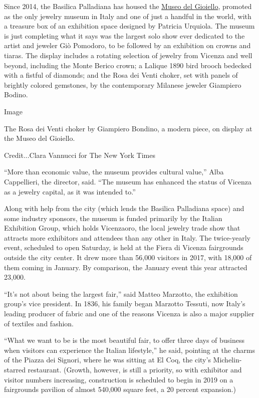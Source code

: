 Since 2014, the Basilica Palladiana has housed the
\href{https://www.nytimes.com/2016/03/14/fashion/jewelry-museum-vicenza-italy.html}{Museo
del Gioiello}, promoted as the only jewelry museum in Italy and one of
just a handful in the world, with a treasure box of an exhibition space
designed by Patricia Urquiola. The museum is just completing what it
says was the largest solo show ever dedicated to the artist and jeweler
Giò Pomodoro, to be followed by an exhibition on crowns and tiaras. The
display includes a rotating selection of jewelry from Vicenza and well
beyond, including the Monte Berico crown; a Lalique 1890 bird brooch
bedecked with a fistful of diamonds; and the Rosa dei Venti choker, set
with panels of brightly colored gemstones, by the contemporary Milanese
jeweler Giampiero Bodino.

Image

The Rosa dei Venti choker by Giampiero Bondino, a modern piece, on
display at the Museo del Gioiello.

Credit...Clara Vannucci for The New York Times

``More than economic value, the museum provides cultural value,'' Alba
Cappellieri, the director, said. ``The museum has enhanced the status of
Vicenza as a jewelry capital, as it was intended to.''

Along with help from the city (which lends the Basilica Palladiana
space) and some industry sponsors, the museum is funded primarily by the
Italian Exhibition Group, which holds Vicenzaoro, the local jewelry
trade show that attracts more exhibitors and attendees than any other in
Italy. The twice-yearly event, scheduled to open Saturday, is held at
the Fiera di Vicenza fairgrounds outside the city center. It drew more
than 56,000 visitors in 2017, with 18,000 of them coming in January. By
comparison, the January event this year attracted 23,000.

``It's not about being the largest fair,'' said Matteo Marzotto, the
exhibition group's vice president. In 1836, his family began Marzotto
Tessuti, now Italy's leading producer of fabric and one of the reasons
Vicenza is also a major supplier of textiles and fashion.

``What we want to be is the most beautiful fair, to offer three days of
business when visitors can experience the Italian lifestyle,'' he said,
pointing at the charms of the Piazza dei Signori, where he was sitting
at El Coq, the city's Michelin-starred restaurant. (Growth, however, is
still a priority, so with exhibitor and visitor numbers increasing,
construction is scheduled to begin in 2019 on a fairgrounds pavilion of
almost 540,000 square feet, a 20 percent expansion.)

